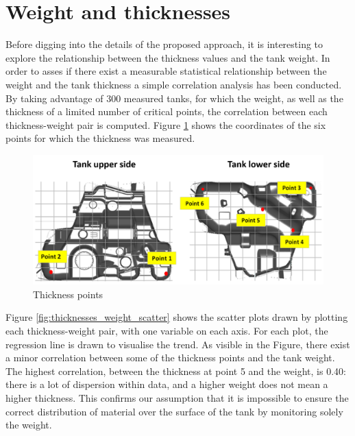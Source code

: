 \section{Weight and thicknesses}


Before digging into the details of the proposed approach, it is interesting to explore the relationship between the thickness values and the tank weight. In order to asses if there exist a measurable statistical relationship between the weight and the tank thickness a simple correlation analysis has been conducted. By taking advantage of 300 measured tanks, for which the weight, as well as the thickness of a limited number of critical points, the correlation between each thickness-weight pair is computed. Figure \ref{fig:thickness_points} shows the coordinates of the six points for which the thickness was measured. 
%
\begin{figure}
\centering
\includegraphics[scale=0.55]{images/chapter_4/Thickness_points.png}
\caption{Thickness points}
\label{fig:thickness_points}
\end{figure}
%
Figure \ref{fig:thicknesses_weight_scatter} shows the scatter plots drawn by plotting each thickness-weight pair, with one variable on each axis. For each plot, the regression line is drawn to visualise the trend. As visible in the Figure, there exist a minor correlation between some of the thickness points and the tank weight. The highest correlation, between the thickness at point 5 and the weight, is 0.40: there is a lot of dispersion within data, and a higher weight does not mean a higher thickness. This confirms our assumption that it is impossible to ensure the correct distribution of material over the surface of the tank by monitoring solely the weight. 
%
